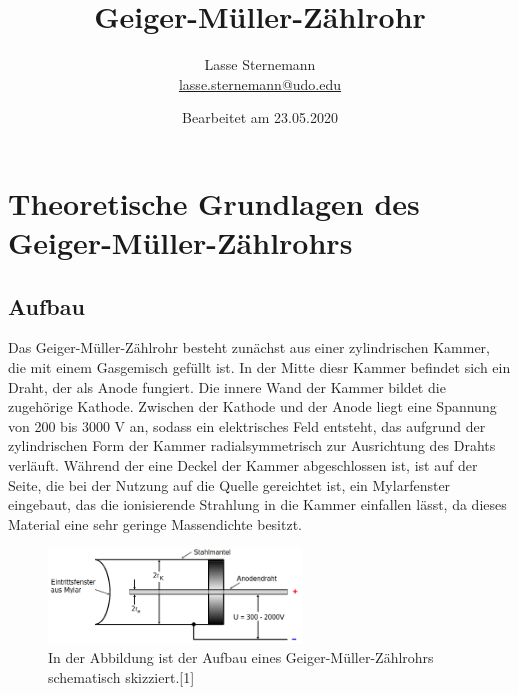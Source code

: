 \documentclass[titlepage = firstcover]{scrartcl}
\title{Geiger-Müller-Zählrohr}
\author{
  Lasse Sternemann\\
  \href{mailto:lasse.sternemann@udo.edu}{lasse.sternemann@udo.edu}
}
\date{Bearbeitet am 23.05.2020}
\begin{document}
    \maketitle
    \newpage
    \tableofcontents
    \newpage

    \section{Theoretische Grundlagen des Geiger-Müller-Zählrohrs}
        \subsection{Aufbau}
            Das Geiger-Müller-Zählrohr besteht zunächst aus einer zylindrischen Kammer, die mit einem Gasgemisch gefüllt ist. In der Mitte diesr Kammer befindet sich ein Draht, der als Anode fungiert.
            Die innere Wand der Kammer bildet die zugehörige Kathode. Zwischen der Kathode und der Anode liegt eine Spannung von 200 bis 3000 V an, sodass ein elektrisches Feld entsteht, das aufgrund 
            der zylindrischen Form der Kammer radialsymmetrisch zur Ausrichtung des Drahts verläuft. Während der eine Deckel der Kammer abgeschlossen ist, ist auf der Seite, die bei der Nutzung auf die Quelle gereichtet ist, ein
            Mylarfenster eingebaut, das die ionisierende Strahlung in die Kammer einfallen lässt, da dieses Material eine sehr geringe Massendichte besitzt.

            \FloatBarrier

            \begin{figure}[h]
              \centering
              \includegraphics[width = 0.6\textwidth]{Bilder/Aufbau.png}
              \caption{In der Abbildung ist der Aufbau eines Geiger-Müller-Zählrohrs schematisch skizziert.[1]}
              \label{fig:Aufbau}
            \end{figure}

            \FloatBarrier

        \noindent
\end{document}
